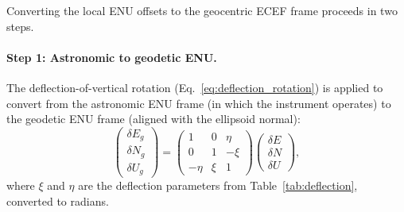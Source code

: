 Converting the local ENU offsets to the geocentric ECEF frame proceeds in two steps.

\paragraph{Step 1: Astronomic to geodetic ENU.} The deflection-of-vertical rotation (Eq.~\ref{eq:deflection_rotation}) is applied to convert from the astronomic ENU frame (in which the instrument operates) to the geodetic ENU frame (aligned with the ellipsoid normal):
\begin{equation}
\begin{pmatrix} \delta E_g \\ \delta N_g \\ \delta U_g \end{pmatrix}
=
\begin{pmatrix}
1 & 0 & \eta \\
0 & 1 & -\xi \\
-\eta & \xi & 1
\end{pmatrix}
\begin{pmatrix} \delta E \\ \delta N \\ \delta U \end{pmatrix},
\label{eq:astro_to_geod}
\end{equation}
where $\xi$ and $\eta$ are the deflection parameters from Table~\ref{tab:deflection}, converted to radians.

